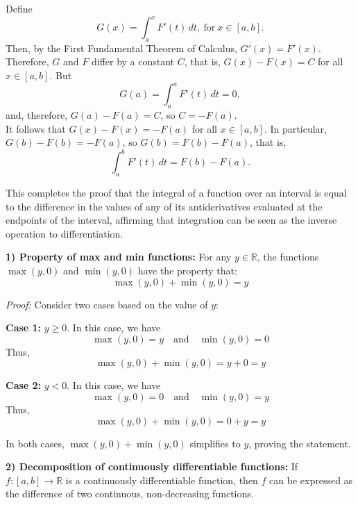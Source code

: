 Define
\[
G(x) = \int_a^x F'(t) \, dt, ~\text{for}~ x \in [a, b].
\]
Then, by the First Fundamental Theorem of Calculus, $G'(x) = F'(x)$. Therefore, $G$ and $F$ differ by a constant $C$, that is, $G(x) - F(x) = C$ for all $x \in [a, b]$. But
\[
G(a) = \int_a^a F'(t) \, dt = 0,
\]
and, therefore,  $G(a) - F(a) = C$, so $\boxed{C = -F(a)}$.\\

It follows that $\boxed{G(x) - F(x) = -F(a)}$ for all $x \in [a, b]$. In particular, $G(b) - F(b) = -F(a)$, so $G(b) = F(b) - F(a)$, that is,
\[
\int_a^b F'(t) \, dt = F(b) - F(a).
\]

This completes the proof that the integral of a function over an interval is equal to the difference in the values of any of its antiderivatives evaluated at the endpoints of the interval, affirming that integration can be seen as the inverse operation to differentiation.

\Qed

\bigskip 
{}

\bigskip



\textbf{1) Property of max and min functions:} For any \( y \in \mathbb{R} \), the functions \(\max(y,0)\) and \(\min(y,0)\) have the property that:
\[
\max(y, 0) + \min(y, 0) = y
\]

\textit{Proof:} Consider two cases based on the value of \( y \):

\textbf{Case 1:} \( y \geq 0 \). In this case, we have
\[
\max(y, 0) = y \quad \text{and} \quad \min(y, 0) = 0
\]
Thus,
\[
\max(y, 0) + \min(y, 0) = y + 0 = y
\]

\textbf{Case 2:} \( y < 0 \). In this case, we have
\[
\max(y, 0) = 0 \quad \text{and} \quad \min(y, 0) = y
\]
Thus,
\[
\max(y, 0) + \min(y, 0) = 0 + y = y
\]

In both cases, \(\max(y, 0) + \min(y, 0)\) simplifies to \( y \), proving the statement.
\Qed

\bigskip

\textbf{2) Decomposition of continuously differentiable functions:}  If \( f: [a, b] \to \mathbb{R} \) is a continuously differentiable function, then \( f \) can be expressed as the difference of two continuous, non-decreasing functions. \\

